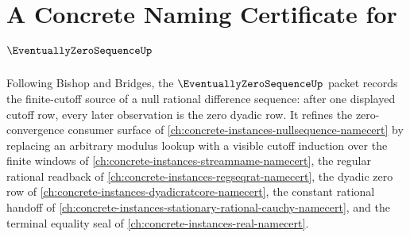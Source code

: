 \chapter{A Concrete Naming Certificate for $\EventuallyZeroSequenceUp$}
\label{ch:concrete-instances-eventually-zero-sequence-namecert}

Following Bishop and Bridges, the $\EventuallyZeroSequenceUp$ packet records the finite-cutoff source of a null rational difference sequence: after one displayed cutoff row, every later observation is the zero dyadic row. It refines the zero-convergence consumer surface of \autoref{ch:concrete-instances-nullsequence-namecert} by replacing an arbitrary modulus lookup with a visible cutoff induction over the finite windows of \autoref{ch:concrete-instances-streamname-namecert}, the regular rational readback of \autoref{ch:concrete-instances-regseqrat-namecert}, the dyadic zero row of \autoref{ch:concrete-instances-dyadicratcore-namecert}, the constant rational handoff of \autoref{ch:concrete-instances-stationary-rational-cauchy-namecert}, and the terminal equality seal of \autoref{ch:concrete-instances-real-namecert}.

